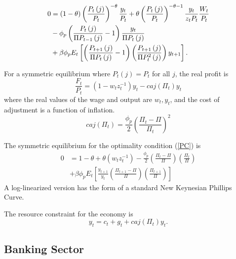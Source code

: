\documentclass[]{article}
\begin{document}
\begin{equation} \label{PC}
\begin{split}
0 &=\left( 1-\theta \right) \left( \frac{P_{t}\left( j\right) }{P_{t}}%
\right) ^{-\theta }\frac{y_{t}}{P_{t}}+\theta \left( \frac{P_{t}\left(
j\right) }{P_{t}}\right) ^{-\theta -1}\frac{y_{t}}{z_{t}P_{t}}\frac{W_{t}}{%
P_{t}} \\
&-\phi _{p}\left( \frac{P_{t}\left( j\right) }{\Pi
P_{t-1}\left( j\right) }-1\right) \frac{y_{t}}{\Pi
P_{t}\left( j\right) } \\
&+\beta \phi _{p}E_{t}\left[ \left( \frac{P_{t+1}\left( j\right) }{\Pi P_{t}\left( j\right) }-1\right) \left( \frac{P_{t+1}\left(
j\right) }{\Pi P_{t}^{2}\left( j\right) }\right) y_{t+1}%
\right] .
\end{split}
\end{equation}

For a symmetric equilibrium where $P_{t}(j)=P_{t}$ for all $j$, the real profit is
\begin{equation} \label{real profit sym}
\frac{F_{t}}{P_{t}}=\left(1-w_{t}z_{t}^{-1}\right)y_{t}-caj(\Pi_{t})y_{t}
\end{equation}
where the real values of the wage and output are $w_{t},y_{t}$, and the cost of adjustment is a function of inflation.
\[
caj(\Pi_{t})=\frac{\phi_{p}}{2}\left(\frac{\Pi_{t}-\Pi}{\Pi_{t}}\right)^{2}
\]

The symmetric equilibrium for the optimality condition (\ref{PC}) is
\begin{equation} \label{PCsym}
\begin{split}
0 &=1-\theta+\theta(w_{t}z_{t}^{-1})-\frac{\phi_{p}}{2}\left(\frac{\Pi_{t}-\Pi}{\Pi}\right)\left(\frac{\Pi_{t}}{\Pi}\right) \\
&+\beta\phi_{p}E_{t}\left[\frac{y_{t+1}}{y_{t}}\left(\frac{\Pi_{t+1}-\Pi}{\Pi}\right)\left(\frac{\Pi_{t+1}}
{\Pi}\right)\right]
\end{split}
\end{equation}
A log-linearized version has the form of a standard New Keynesian
Phillips Curve.

The resource constraint for the economy is
\begin{equation} \label{ycg}
    y_{t}=c_{t}+g_{t}+caj(\Pi_{t})y_{t}.
\end{equation}

\subsection{Banking Sector}
\end{document}
